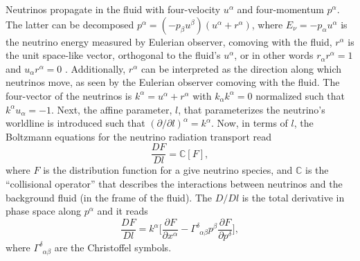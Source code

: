 Neutrinos propagate in the fluid with four-velocity $u^{\alpha}$ and four-momentum $p^{\alpha}$.
The latter can be decomposed
%
$p^{\alpha} = (-p_{\beta}u^{\beta})(u^{\alpha} + r^{\alpha})$, 
%
where $E_{\nu}=-p_{\alpha}u^{\alpha}$ is the neutrino energy measured by Eulerian observer,
comoving with the fluid, $r^{\alpha}$ is the unit space-like vector, orthogonal to the 
fluid's $u^{\alpha}$, or in other words $r_{\alpha}r^{\alpha}=1$ and $u_{\alpha}r^{\alpha}=0$ \citep{Thorne:1981}.
%
Additionally, $r^{\alpha}$ can be interpreted as the direction along which neutrinos move,
as seen by the Eulerian observer comoving with the fluid.
%
The four-vector of the neutrinos is
%
$k^{\alpha} = u^{\alpha} + r^{\alpha}$ 
%
with $k_{\alpha}k^{\alpha} = 0$ normalized such that $k^{\alpha}u_{\alpha}=-1$.
%
Next, the affine parameter, $l$, that parameterizes the neutrino's worldline is introduced
%
% 
such that $(\partial / \partial l)^{\alpha} = k^{\alpha}$.
%
Now, in terms of $l$, the Boltzmann equations for the neutrino radiation transport read \citep{Thorne:1981}
%
\begin{equation*}
\frac{D F}{D l} = \mathbb{C}[F],
\end{equation*}
%
where $F$ is the distribution function for a give neutrino species, and $\mathbb{C}$ is the
``collisional operator'' that describes the interactions 
between neutrinos and the background fluid (in the frame of the fluid). 
%
The $D/Dl$ is the total derivative in phase space along $p^{\alpha}$ and it reads 
%
\begin{equation}
\label{eq:method:whisky:neut:bolzeq}
\frac{DF}{Dl} = k^{\alpha} \Big[ \frac{\partial F}{\partial x^{\alpha}} - \Gamma^{\delta}_{\:\:\alpha\beta}p^{\beta}\frac{\partial F}{\partial p^{\delta}} \Big],
\end{equation}
%
where $\Gamma^{\delta}_{\:\:\alpha\beta}$ are the Christoffel symbols.
%

